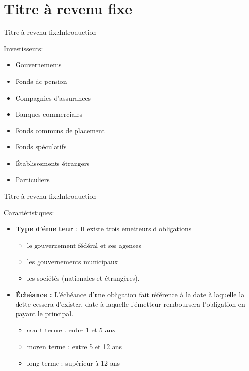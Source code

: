 \documentclass{beamer}
\begin{document}
\section{Titre à revenu fixe}
\begin{frame}{Titre à revenu fixe}{Introduction}
\begin{block}{Investisseurs:}
\begin{itemize}
\item Gouvernements
\item Fonds de pension
\item Compagnies d'assurances 
\item Banques commerciales
\item Fonds communs de placement
\item Fonds spéculatifs
\item Établissements étrangers
\item Particuliers
\end{itemize}
\end{block}
\end{frame}


\begin{frame}{Titre à revenu fixe}{Introduction}
\begin{block}{Caractéristiques:}
\begin{itemize}
\item \textbf{Type d'émetteur :} Il existe trois émetteurs d'obligations.
\begin{itemize}
\item le gouvernement fédéral et ses agences
\item les gouvernements municipaux
\item les sociétés (nationales et étrangères).
\end{itemize}
\item \textbf{Échéance :} L'échéance d'une obligation fait référence à la date à laquelle la dette cessera d'exister, date à laquelle l'émetteur remboursera l'obligation en payant le principal.
\begin{itemize}
\item court terme : entre 1 et 5 ans 
\item moyen terme : entre 5 et 12 ans 
\item long terme : supérieur à 12 ans
\end{itemize}
\end{itemize}
\end{block}
\end{frame}
\end{document}
